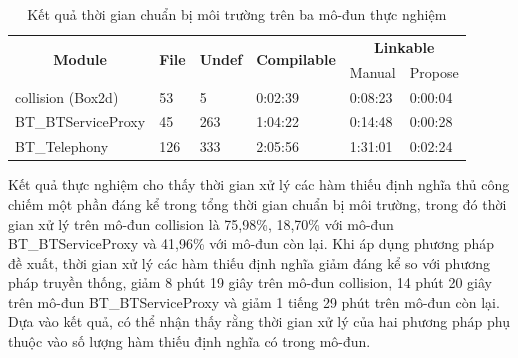 \begin{table}[h]
    \centering
    \caption{Kết quả thời gian chuẩn bị môi trường trên ba mô-đun thực nghiệm}
    \label{tab:time_undef}
\begin{tabular}{|l|l|l|l|ll|}
\hline
\multicolumn{1}{|c|}{\multirow{2}{*}{\textbf{Module}}} & \multicolumn{1}{c|}{\multirow{2}{*}{\textbf{File}}} & \multicolumn{1}{c|}{\multirow{2}{*}{\textbf{Undef}}} & \multirow{2}{*}{\textbf{Compilable}} & \multicolumn{2}{c|}{\textbf{Linkable}} \\ \cline{5-6} 
\multicolumn{1}{|c|}{}                                 & \multicolumn{1}{c|}{}                               & \multicolumn{1}{c|}{}                                &                                      & \multicolumn{1}{l|}{Manual}  & Propose \\ \hline
collision (Box2d)                                      & 53                                                  & 5                                                    & 0:02:39                              & \multicolumn{1}{l|}{0:08:23} & 0:00:04 \\ \hline
BT\_BTServiceProxy                                     & 45                                                  & 263                                                  & 1:04:22                              & \multicolumn{1}{l|}{0:14:48} & 0:00:28 \\ \hline
BT\_Telephony                                          & 126                                                 & 333                                                  & 2:05:56                              & \multicolumn{1}{l|}{1:31:01} & 0:02:24 \\ \hline
\end{tabular}
\end{table}

Kết quả thực nghiệm cho thấy thời gian xử lý các hàm thiếu định nghĩa thủ công chiếm một phần đáng kể trong tổng thời gian chuẩn bị môi trường, trong đó thời gian xử lý trên mô-đun collision là 75,98\%, 18,70\% với mô-đun BT\_BTServiceProxy và 41,96\% với mô-đun còn lại. Khi áp dụng phương pháp đề xuất, thời gian xử lý các hàm thiếu định nghĩa giảm đáng kể so với phương pháp truyền thống, giảm 8 phút 19 giây trên mô-đun collision, 14 phút 20 giây trên mô-đun BT\_BTServiceProxy và giảm 1 tiếng 29 phút trên mô-đun còn lại. Dựa vào kết quả, có thể nhận thấy rằng thời gian xử lý của hai phương pháp phụ thuộc vào số lượng hàm thiếu định nghĩa có trong mô-đun.

